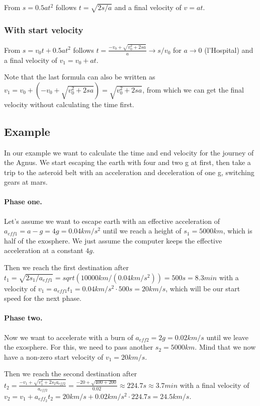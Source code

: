 \documentclass[10pt]{article}
\begin{document}
	From $s = 0.5at^2$ follows $t = \sqrt{2s/a}$ and a final velocity of $v=at$.
	
	\subsubsection{With start velocity}
	
	From $s = v_0t + 0.5at^2$ follows $t = \frac{-v_0 + \sqrt{v^2_0 + 2sa}}{a} \rightarrow s/v_0$ for $a\rightarrow0$ (l'Hospital) and a final velocity of $v_1 = v_0 + at$.
	
	Note that the last formula can also be written as $v_1=v_0 + (-v_0 + \sqrt{v^2_0+2sa}) = \sqrt{v^2_0+2sa}$, from which we can get the final velocity without calculating the time first.
	
	\subsection{Example}
	
	In our example we want to calculate the time and end velocity for the journey of the Agnus. We start escaping the earth with four and two g at first, then take a trip to the asteroid belt with an acceleration and deceleration of one g, switching gears at mars.
	
	\paragraph{Phase one.}
	Let's assume we want to escape earth with an effective acceleration of $a_{eff1} = a-g = 4g = 0.04 km/s^2$ until we reach a height of $s_1=5000 km$, which is half of the exosphere. We just assume the computer keeps the effective acceleration at a constant $4g$.
	
	Then we reach the first destination after $t_1 = \sqrt{2s_1/a_{eff1}} = sqrt(10000km/(0.04km/s^2)) = 500 s = 8.3 min$ with a velocity of $v_1=a_{eff1}t_1=0.04km/s^2\cdot 500s = 20 km/s$, which will be our start speed for the next phase.
	
	\paragraph{Phase two.}
	Now we want to accelerate with a burn of $a_{eff2}=2g=0.02km/s$ until we leave the exosphere. For this, we need to pass another $s_2=5000km$. Mind that we now have a non-zero start velocity of $v_1 = 20 km/s$.
	
	Then we reach the second destination after $t_2 = \frac{-v_1+\sqrt{v^2_1+2s_2a_{eff2}}}{a_{eff2}} =\frac{-20+\sqrt{400+200}}{0.02} \approx 224.7 s \approx 3.7 min $ with a final velocity of $v_2 = v_1 + a_{eff_2}t_2 = 20 km/s + 0.02 km/s^2\cdot 224.7 s = 24.5 km/s$.
	
\end{document}
